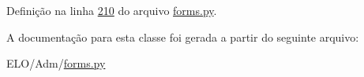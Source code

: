 Definição na linha \hyperlink{Adm_2forms_8py_source_l00210}{210} do arquivo \hyperlink{Adm_2forms_8py_source}{forms.\-py}.



A documentação para esta classe foi gerada a partir do seguinte arquivo\-:\begin{DoxyCompactItemize}
\item 
E\-L\-O/\-Adm/\hyperlink{Adm_2forms_8py}{forms.\-py}\end{DoxyCompactItemize}
